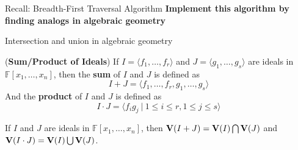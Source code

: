 \documentclass[xcolor=dvipsnames]{beamer}
\begin{document}
\begin{frame}{\large{Recall: Breadth-First Traversal Algorithm}}
{\textbf{Implement this algorithm by finding analogs in algebraic geometry}
}
\end{frame}

\begin{frame}{\large{Intersection and union in algebraic geometry}}
\begin{Definition}
\label{def:sum}
({\bf Sum/Product of Ideals}) If $I = \langle f_1, \dots, f_r\rangle$ and $J = \langle g_1, \dots, g_s\rangle$ are 
ideals in $\mathbb F[x_1, \dots, x_n]$, then the {\bf sum} of $I$ and $J$ is defined as
$$I + J = \langle f_1, \dots, f_r, g_1, \dots, g_s\rangle$$ And the {\bf product} of $I$ and $J$ is defined
as
\begin{equation}
  I \cdot J = \langle f_ig_j\ |\ 1 \leq i \leq r, 1 \leq j \leq s\rangle \nonumber
  \end{equation}
\end{Definition}
\begin{Theorem}
\label{thm:unionintersect}
If $I$ and $J$ are ideals in $\mathbb F[x_1, \dots, x_n]$, then ${\bf
  V}(I + J) = {\bf V}(I) \bigcap {\bf V}(J)$ and ${\bf V}(I \cdot J) =
{\bf V}(I) \bigcup {\bf V}(J)$. 
\end{Theorem}
\end{frame}
\end{document}
